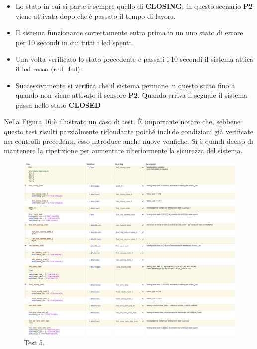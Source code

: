 \documentclass[12pt]{article}
\begin{document}
\begin{itemize}
    \item Lo stato in cui si parte è sempre quello di \textbf{CLOSING}, in questo scenario \textbf{P2} viene attivata dopo che è passato il tempo di lavoro.
    \item Il sistema funzionante correttamente entra prima in un uno stato di errore per 10 secondi in cui tutti i led spenti.
    \item Una volta verificato lo stato precedente e passati i 10 secondi il sistema attica il led rosso (red\_led). 
    \item Successivamente si verifica che il sistema permane in questo stato fino a quando non viene attivato il sensore \textbf{P2}. Quando arriva il segnale il sistema passa nello stato \textbf{CLOSED}
\end{itemize}

Nella Figura 16 è illustrato un caso di test. È importante notare che, sebbene questo test risulti parzialmente ridondante poiché include condizioni già verificate nei controlli precedenti, esso introduce anche nuove verifiche. Si è quindi deciso di mantenere la ripetizione per aumentare ulteriormente la sicurezza del sistema.

\begin{figure}[H]
    
    \hspace{-2.3cm} %
    \includegraphics[width=1.3\textwidth]{Immagini_Test/Test_5_img.PNG}
    \caption{Test 5.}
    \label{fig:Test_5}
\end{figure}
\end{document}
